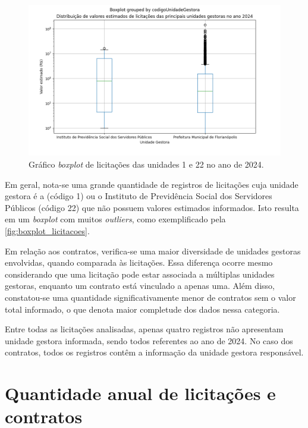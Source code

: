 \documentclass[
	12pt,				%
	oneside,			%
	a4paper,			%
	chapter=TITLE,		%
	section=TITLE,		%
	english,			%
	brazil				%
	]{abntex2}
\begin{document}
\begin{figure}[h]
	\begin{center}
		\caption{\label{fig:boxplot_licitacoes}Gráfico \textit{boxplot} de licitações das unidades 1 e 22 no ano de 2024.}
		\includegraphics[scale=0.5]{images/boxplot_licitacoes_2024.png} %
	\end{center}
\end{figure}

Em geral, nota-se uma grande quantidade de registros de licitações cuja unidade gestora é a  (código 1) ou o Instituto de Previdência Social dos Servidores Públicos (código 22) que não possuem valores estimados informados. Isto resulta em um \textit{boxplot} com muitos \textit{outliers}, como exemplificado pela \autoref{fig:boxplot_licitacoes}.

Em relação aos contratos, verifica-se uma maior diversidade de unidades gestoras envolvidas, quando comparada às licitações. Essa diferença ocorre mesmo considerando que uma licitação pode estar associada a múltiplas unidades gestoras, enquanto um contrato está vinculado a apenas uma. Além disso, constatou-se uma quantidade significativamente menor de contratos sem o valor total informado, o que denota maior completude dos dados nessa categoria.

Entre todas as licitações analisadas, apenas quatro registros não apresentam unidade gestora informada, sendo todos referentes ao ano de 2024. No caso dos contratos, todos os registros contêm a informação da unidade gestora responsável.

\section*{Quantidade anual de licitações e contratos}
\end{document}

